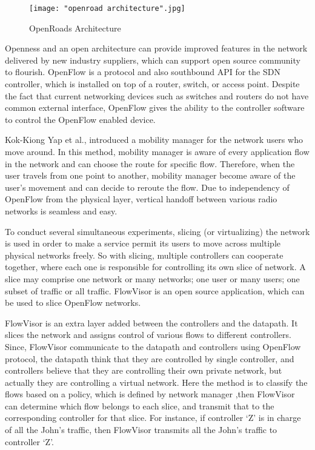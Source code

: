 \documentclass[english]{tktltiki2}
\theoremstyle{definition}
\theoremstyle{remark}
\begin{document}
{\begin{figure}[h!t]
\centering
{}
\texttt{[image: "openroad architecture".jpg]}
\caption{OpenRoads Architecture \cite{Yap10b}}
\label{fig:openroads}
\end{figure}

Openness and an open architecture can provide improved features in the network delivered by new industry suppliers, which can support open source community to flourish. OpenFlow is a protocol and also southbound API for the SDN controller, which is installed on top of a router, switch, or access point. Despite the fact that current networking devices such as switches and routers do not have common external interface, OpenFlow gives the ability to the controller software to control the OpenFlow enabled device. \cite{Yap10a}

Kok-Kiong Yap et al., introduced a mobility manager for the network users who move around. In this method, mobility manager is aware of every application flow in the network and can choose the route for specific flow. Therefore, when the user travels from one point to another, mobility manager become aware of the user’s movement and can decide to reroute the flow. Due to independency of OpenFlow from the physical layer, vertical handoff between various radio networks is seamless and easy. \cite{Yap10a}

To conduct several simultaneous experiments, slicing (or virtualizing) the network is used in order to make a service permit its users to move across multiple physical networks freely. So with slicing, multiple controllers can cooperate together, where each one is responsible for controlling its own slice of network. A slice may comprise one network or many networks; one user or many users; one subset of traffic or all traffic. FlowVisor is an open source application, which can be used to slice OpenFlow networks. \cite{Yap10a}

FlowVisor is an extra layer added between the controllers and the datapath. It slices the network and assigns control of various flows to different controllers. Since, FlowVisor communicate to the datapath and controllers using OpenFlow protocol, the datapath think that they are controlled by single controller, and controllers believe that they are controlling their own private network, but actually they are controlling a virtual network. Here the method is to classify the flows based on a policy, which is defined by network manager ,then FlowVisor can determine which flow belongs to each slice, and transmit that to the corresponding controller for that slice. For instance, if controller ‘Z’ is in charge of all the John’s traffic, then FlowVisor transmits all the John’s traffic to controller ‘Z’. \cite{Yap10a}

}
\end{document}
